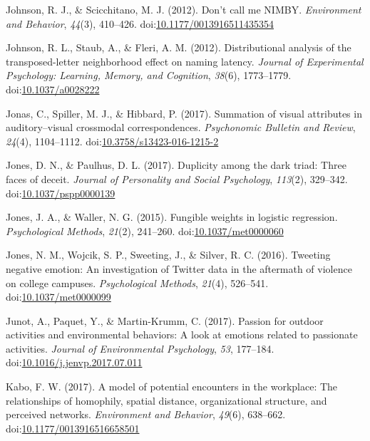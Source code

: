 \documentclass[english,man]{apa6}
\theoremstyle{definition}
\theoremstyle{definition}
\theoremstyle{definition}
\theoremstyle{remark}
\begin{document}
\hypertarget{ref-Johnson2012}{}
Johnson, R. J., \& Scicchitano, M. J. (2012). Don't call me NIMBY.
\emph{Environment and Behavior}, \emph{44}(3), 410--426.
doi:\href{https://doi.org/10.1177/0013916511435354}{10.1177/0013916511435354}

\hypertarget{ref-Johnson2012a}{}
Johnson, R. L., Staub, A., \& Fleri, A. M. (2012). Distributional
analysis of the transposed-letter neighborhood effect on naming latency.
\emph{Journal of Experimental Psychology: Learning, Memory, and
Cognition}, \emph{38}(6), 1773--1779.
doi:\href{https://doi.org/10.1037/a0028222}{10.1037/a0028222}

\hypertarget{ref-Jonas2017}{}
Jonas, C., Spiller, M. J., \& Hibbard, P. (2017). Summation of visual
attributes in auditory--visual crossmodal correspondences.
\emph{Psychonomic Bulletin and Review}, \emph{24}(4), 1104--1112.
doi:\href{https://doi.org/10.3758/s13423-016-1215-2}{10.3758/s13423-016-1215-2}

\hypertarget{ref-Jones2017}{}
Jones, D. N., \& Paulhus, D. L. (2017). Duplicity among the dark triad:
Three faces of deceit. \emph{Journal of Personality and Social
Psychology}, \emph{113}(2), 329--342.
doi:\href{https://doi.org/10.1037/pspp0000139}{10.1037/pspp0000139}

\hypertarget{ref-Jones2015}{}
Jones, J. A., \& Waller, N. G. (2015). Fungible weights in logistic
regression. \emph{Psychological Methods}, \emph{21}(2), 241--260.
doi:\href{https://doi.org/10.1037/met0000060}{10.1037/met0000060}

\hypertarget{ref-Jones2016}{}
Jones, N. M., Wojcik, S. P., Sweeting, J., \& Silver, R. C. (2016).
Tweeting negative emotion: An investigation of Twitter data in the
aftermath of violence on college campuses. \emph{Psychological Methods},
\emph{21}(4), 526--541.
doi:\href{https://doi.org/10.1037/met0000099}{10.1037/met0000099}

\hypertarget{ref-Junot2017}{}
Junot, A., Paquet, Y., \& Martin-Krumm, C. (2017). Passion for outdoor
activities and environmental behaviors: A look at emotions related to
passionate activities. \emph{Journal of Environmental Psychology},
\emph{53}, 177--184.
doi:\href{https://doi.org/10.1016/j.jenvp.2017.07.011}{10.1016/j.jenvp.2017.07.011}

\hypertarget{ref-Kabo2017}{}
Kabo, F. W. (2017). A model of potential encounters in the workplace:
The relationships of homophily, spatial distance, organizational
structure, and perceived networks. \emph{Environment and Behavior},
\emph{49}(6), 638--662.
doi:\href{https://doi.org/10.1177/0013916516658501}{10.1177/0013916516658501}
\end{document}
